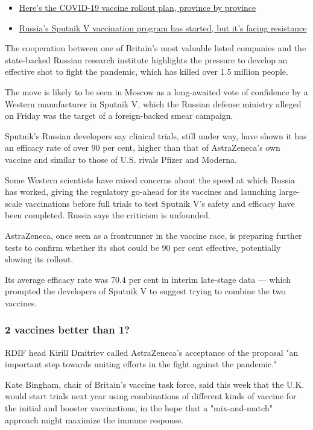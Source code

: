 \begin{itemize}
				\item \href{https://www.cbc.ca/news/canada/covid19-vaccine-rollout-plans-canada-1.5836262}{Here's the COVID-19 vaccine rollout plan, province by province}
				\item \href{https://www.cbc.ca/news/world/russia-vaccine-caution-1.5833611}{Russia's Sputnik V vaccination program has started, but it's facing resistance}
\end{itemize}

The cooperation between one of Britain's most valuable listed companies and the
state-backed Russian research institute highlights the pressure to develop an
effective shot to fight the pandemic, which has killed over 1.5 million people.

The move is likely to be seen in Moscow as a long-awaited vote of confidence by
a Western manufacturer in Sputnik V, which the Russian defense ministry alleged
on Friday was the target of a foreign-backed smear campaign.

Sputnik's Russian developers say clinical trials, still under way, have shown
it has an efficacy rate of over 90 per cent, higher than that of AstraZeneca's
own vaccine and similar to those of U.S. rivals Pfizer and Moderna.

Some Western scientists have raised concerns about the speed at which Russia
has worked, giving the regulatory go-ahead for its vaccines and launching
large-scale vaccinations before full trials to test Sputnik V's safety and
efficacy have been completed. Russia says the criticism is unfounded.

AstraZeneca, once seen as a frontrunner in the vaccine race, is preparing
further tests to confirm whether its shot could be 90 per cent effective,
potentially slowing its rollout.

Its average efficacy rate was 70.4 per cent in interim late-stage data — which
prompted the developers of Sputnik V to suggest trying to combine the two
vaccines.

\subsubsection{2 vaccines better than 1?}

RDIF head Kirill Dmitriev called AstraZeneca's acceptance of the proposal "an
important step towards uniting efforts in the fight against the pandemic."

Kate Bingham, chair of Britain's vaccine task force, said this week that the
U.K. would start trials next year using combinations of different kinds of
vaccine for the initial and booster vaccinations, in the hope that a
"mix-and-match" approach might maximize the immune response.

